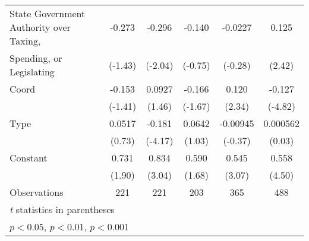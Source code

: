 {\begin{tabular}{l*{5}{c}}
\addlinespace
State Government Authority over Taxing, &-0.273         &-0.296\sym{*}  &-0.140         &-0.0227         &0.125\sym{*}  \\
Spending, or Legislating                &(-1.43)         &(-2.04)         &(-0.75)         &(-0.28)         &(2.42)         \\
\addlinespace
Coord                                   &-0.153         &0.0927         &-0.166         &0.120\sym{*}  &-0.127\sym{***}\\
                                        &(-1.41)         &(1.46)         &(-1.67)         &(2.34)         &(-4.82)         \\
\addlinespace
Type                                    &0.0517         &-0.181\sym{***}&0.0642         &-0.00945         &0.000562         \\
                                        &(0.73)         &(-4.17)         &(1.03)         &(-0.37)         &(0.03)         \\
\addlinespace
Constant                                &0.731         &0.834\sym{**} &0.590         &0.545\sym{**} &0.558\sym{***}\\
                                        &(1.90)         &(3.04)         &(1.68)         &(3.07)         &(4.50)         \\
\midrule
Observations                            &  221         &  221         &  203         &  365         &  488         \\
\bottomrule
\multicolumn{6}{l}{\footnotesize \textit{t} statistics in parentheses}\\
\multicolumn{6}{l}{\footnotesize \sym{*} \(p<0.05\), \sym{**} \(p<0.01\), \sym{***} \(p<0.001\)}\\
\end{tabular}
}
